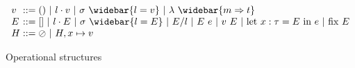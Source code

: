\documentclass[sigplan]{acmart}
\theoremstyle{definition}
\begin{document}
\begin{figure*}[h]
\[
  \begin{array}{l @{} l}
    v 
    &{} ::=
    \begin{array}[t]{@{} l}
      () 
      \ |\ 
      l \cdot v
      \ |\ 
      \sigma\ \widebar{l = v}
      \ |\ 
      \lambda\ \widebar{m \Rightarrow t} 
    \end{array}
    \\
    E 
    &{} ::=
    []
    \ |\ 
    l \cdot E 
    \ |\ 
    \sigma\ \widebar{l = E}
    \ |\ 
    E/l
    \ |\ 
    E\ e 
    \ |\ 
    v\ E
    \ |\ 
    \text{let } x : \tau = E\ \text{in}\ e 
    \ |\ 
    \text{fix } E 
    \\
    H 
    &{} ::=
    \oslash
    \ |\ 
    H, x \mapsto v
  \end{array}
\]
\caption{Operational structures}
\end{figure*}
  




  
\end{document}
